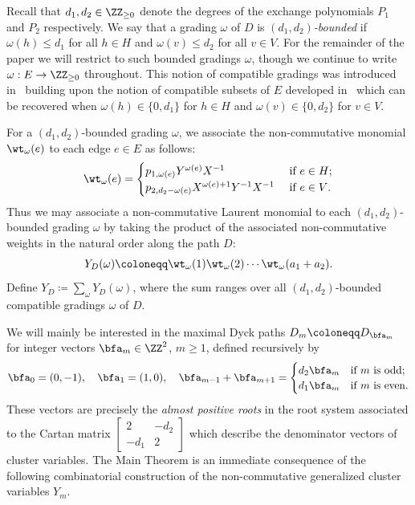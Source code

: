  Recall that $d_1,d_2\in\ZZ_{\ge0}$ denote the degrees of the exchange polynomials $P_1$ and $P_2$ respectively. 
 We say that a grading $\omega$ of $D$ is \emph{$(d_1,d_2)$-bounded} if $\omega(h)\le d_1$ for all $h\in H$ and $\omega(v)\le d_2$ for all $v\in V$. 
 For the remainder of the paper we will restrict to such bounded gradings $\omega$, though we continue to write $\omega:E\to\ZZ_{\ge0}$ throughout.
 This notion of compatible gradings was introduced in~\cite{rupel2} building upon the notion of compatible subsets of $E$ developed in~\cite{lee-li-zelevinsky} which can be recovered when $\omega(h)\in\{0,d_1\}$ for $h\in H$ and $\omega(v)\in\{0,d_2\}$ for $v\in V$.

 For a $(d_1,d_2)$-bounded grading $\omega$, we associate the non-commutative monomial $\wt_\omega(e)$ to each edge $e\in E$ as follows:
 \begin{equation}
 \label{eq:edge weights}
 \wt_\omega(e)=\begin{cases}
 p_{1,\omega(e)}Y^{\omega(e)}X^{-1} & \text{ if $e\in H$;}\\
 p_{2,d_2-\omega(e)}X^{\omega(e)+1}Y^{-1}X^{-1} & \text{ if $e\in V$.}\\
 \end{cases}
 \end{equation}
 Thus we may associate a non-commutative Laurent monomial to each $(d_1,d_2)$-bounded grading $\omega$ by taking the product of the associated non-commutative weights in the natural order along the path $D$:
 \begin{equation}
 \label{eq:total path weights}
 Y_D(\omega)\coloneqq \wt_\omega(1)\wt_\omega(2)\cdots\wt_\omega(a_1+a_2).
 \end{equation} 
 Define $Y_D\coloneqq \sum\limits_\omega Y_D(\omega)$, where the sum ranges over all $(d_1,d_2)$-bounded compatible gradings $\omega$ of $D$.

 We will mainly be interested in the maximal Dyck paths $D_m\coloneqq D_{\bfa_m}$ for integer vectors $\bfa_m\in\ZZ^2$, $m\ge1$, defined recursively by
 \begin{equation}
 \label{eq:roots recursive}
 \bfa_0=(0,-1),\quad
 \bfa_1=(1,0),\quad
 \bfa_{m-1}+\bfa_{m+1}=\begin{cases}d_2\bfa_m & \text{if $m$ is odd;}\\ d_1\bfa_m & \text{if $m$ is even.}\end{cases}
 \end{equation}
 These vectors are precisely the \emph{almost positive roots} in the root system associated to the Cartan matrix $\left[\begin{array}{cc} 2 & -d_2\\ -d_1 & 2\end{array}\right]$ which describe the denominator vectors of cluster variables.
 The Main Theorem is an immediate consequence of the following combinatorial construction of the non-commutative generalized cluster variables $Y_m$.
